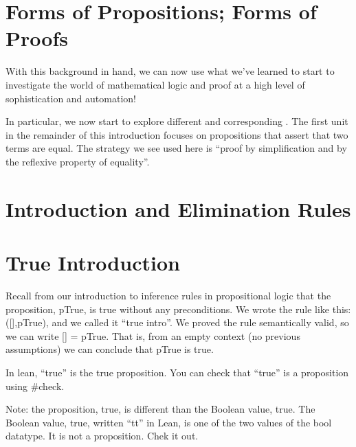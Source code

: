 \documentclass[letterpaper,10pt,english]{sphinxmanual}
\begin{document}
\section{Forms of Propositions; Forms of Proofs}
\label{\detokenize{15-proofs:forms-of-propositions-forms-of-proofs}}
With this background in hand, we can now use
what we’ve learned to start to investigate the
world of mathematical logic and proof at a high
level of sophistication and automation!

In particular, we now start to explore different
 and corresponding . The first unit in the remainder of
this introduction focuses on propositions that
assert that two terms are equal. The strategy
we see used here is “proof by simplification
and by the reflexive property of equality”.


\section{Introduction and Elimination Rules}
\label{\detokenize{15-proofs:introduction-and-elimination-rules}}

\section{True Introduction}
\label{\detokenize{15-proofs:true-introduction}}
Recall from our introduction to inference rules in propositional logic
that the proposition, pTrue, is true without any preconditions. We
wrote the rule like this: ({[}{]},pTrue), and we called it “true intro”.
We proved the rule semantically valid, so we can write {[}{]} {\color{red}\bfseries{}\textbar{}}=
pTrue. That is, from an empty context (no previous assumptions) we can
conclude that pTrue is true.

In lean, “true” is the true proposition.  You can check that “true” is
a proposition using \#check.

\begin{sphinxVerbatim}[commandchars=\\\{\}]
 
\end{sphinxVerbatim}

Note: the proposition, true, is different than the Boolean value,
true. The Boolean value, true, written “tt” in Lean, is one of the two
values of the bool datatype. It is not a proposition.  Chek it out.

\begin{sphinxVerbatim}[commandchars=\\\{\}]
 
\end{sphinxVerbatim}
\end{document}
